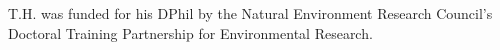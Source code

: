 \documentclass[draft]{agujournal2019}
\begin{document}
%




%
%
%
%
%
%
%
%


\acknowledgments

T.H. was funded for his DPhil by the Natural Environment Research Council's Doctoral Training Partnership for Environmental Research. 


%
%


















%
%
%
%
%
\end{document}
